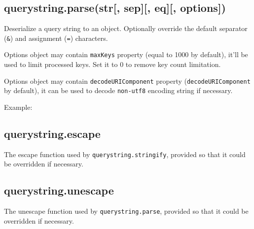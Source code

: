 \subsection{querystring.parse(str{[}, sep{]}{[}, eq{]}{[},
options{]})}\label{querystring.parsestr-sep-eq-options}

Deserialize a query string to an object. Optionally override the default
separator (\texttt{\textquotesingle{}\&\textquotesingle{}}) and
assignment (\texttt{\textquotesingle{}=\textquotesingle{}}) characters.

Options object may contain \texttt{maxKeys} property (equal to 1000 by
default), it'll be used to limit processed keys. Set it to 0 to remove
key count limitation.

Options object may contain \texttt{decodeURIComponent} property
(\texttt{decodeURIComponent} by default), it can be used to decode
\texttt{non-utf8} encoding string if necessary.

Example:

\begin{Shaded}
\end{Shaded}

\subsection{querystring.escape}\label{querystring.escape}

The escape function used by \texttt{querystring.stringify}, provided so
that it could be overridden if necessary.

\subsection{querystring.unescape}\label{querystring.unescape}

The unescape function used by \texttt{querystring.parse}, provided so
that it could be overridden if necessary.
